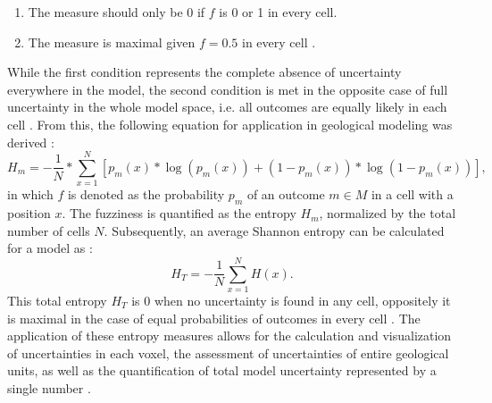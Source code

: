         \begin{enumerate}
	        \item The measure should only be 0 if $f$ is 0 or 1 in every cell.
	        \item The measure is maximal given $f = 0.5$ in every cell \citep{de1972definition}.
        \end{enumerate}
        While the first condition represents the complete absence of uncertainty everywhere in the model, the second condition is met in the opposite case of full uncertainty in the whole model space, i.e. all outcomes are equally likely in each cell \citep{schaaf2017}. From this, the following equation for application in geological modeling was derived \citep{Mann1993,wellmann2012uncertainties}:
        \begin{equation}
	        H_m = -\frac{1}{N}*\sum_{x=1}^{N}[p_m(x)*\log(p_m(x))+(1-p_m(x))*\log(1-p_m(x))],
        \end{equation}
        in which $f$ is denoted as the probability $p_m$ of an outcome $m\in M$ in a cell with a position $x$. The fuzziness is quantified as the entropy $H_m$, normalized by the total number of cells $N$. Subsequently, an average Shannon entropy can be calculated for a model as \citep{wellmann2012uncertainties}:
        \begin{equation}
	        H_T = -\frac{1}{N}\sum_{x=1}^{N}H(x).
        \end{equation}
        This total entropy $H_T$ is 0 when no uncertainty is found in any cell, oppositely it is maximal in the case of equal probabilities of outcomes in every cell \citep{wellmann2012uncertainties, schaaf2017}. The application of these entropy measures allows for the calculation and visualization of uncertainties in each voxel, the assessment of uncertainties of entire geological units, as well as the quantification of total model uncertainty represented by a single number \citep{wellmann2012uncertainties}.
        

